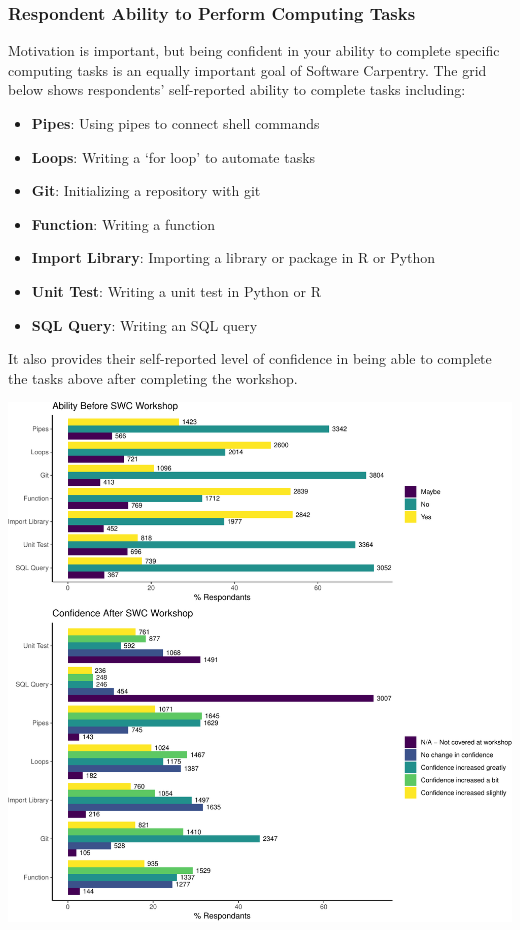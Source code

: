 \documentclass[]{article}
\makeatletter
\def\maxwidth{\ifdim\Gin@nat@width>\linewidth\linewidth\else\Gin@nat@width\fi}
\providecommand{\tightlist}{%
  \setlength{\itemsep}{0pt}\setlength{\parskip}{0pt}}
\makeatother
\begin{document}
\subsubsection{Respondent Ability to Perform Computing
Tasks}\label{respondent-ability-to-perform-computing-tasks}

Motivation is important, but being confident in your ability to complete
specific computing tasks is an equally important goal of Software
Carpentry. The grid below shows respondents' self-reported ability to
complete tasks including:

\begin{itemize}
\tightlist
\item
  \textbf{Pipes}: Using pipes to connect shell commands
\item
  \textbf{Loops}: Writing a `for loop' to automate tasks\\
\item
  \textbf{Git}: Initializing a repository with git
\item
  \textbf{Function}: Writing a function
\item
  \textbf{Import Library}: Importing a library or package in R or Python
\item
  \textbf{Unit Test}: Writing a unit test in Python or R
\item
  \textbf{SQL Query}: Writing an SQL query
\end{itemize}

It also provides their self-reported level of confidence in being able
to complete the tasks above after completing the workshop.

\includegraphics[width=\maxwidth]{../figures/swc-ability-confidence-1}
\end{document}
